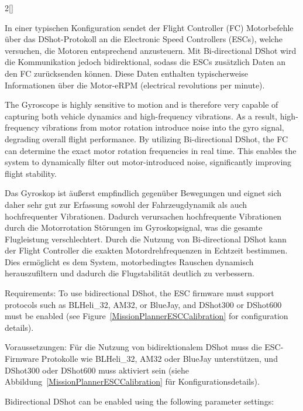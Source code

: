 \begin{paracol}{2}[]
\colger

In einer typischen Konfiguration sendet der Flight Controller (FC) Motorbefehle über das DShot-Protokoll an die Electronic Speed Controllers (ESCs), welche versuchen, die Motoren entsprechend anzusteuern. Mit Bi-directional DShot wird die Kommunikation jedoch bidirektional, sodass die ESCs zusätzlich Daten an den FC zurücksenden können. Diese Daten enthalten typischerweise Informationen über die Motor-eRPM (electrical revolutions per minute).

\coleng

The Gyroscope is highly sensitive to motion and is therefore very capable of capturing both vehicle dynamics and high-frequency vibrations. As a result, high-frequency vibrations from motor rotation introduce noise into the gyro signal, degrading overall flight performance. By utilizing Bi-directional DShot, the FC can determine the exact motor rotation frequencies in real time. This enables the system to dynamically filter out motor-introduced noise, significantly improving flight stability.

\colger

Das Gyroskop ist äußerst empfindlich gegenüber Bewegungen und eignet sich daher sehr gut zur Erfassung sowohl der Fahrzeugdynamik als auch hochfrequenter Vibrationen. Dadurch verursachen hochfrequente Vibrationen durch die Motorrotation Störungen im Gyroskopsignal, was die gesamte Flugleistung verschlechtert. Durch die Nutzung von Bi-directional DShot kann der Flight Controller die exakten Motordrehfrequenzen in Echtzeit bestimmen. Dies ermöglicht es dem System, motorbedingtes Rauschen dynamisch herauszufiltern und dadurch die Flugstabilität deutlich zu verbessern.

\coleng

Requirements: To use bidirectional DShot, the ESC firmware must support protocols such as BLHeli\_32, AM32, or BlueJay, and DShot300 or DShot600 must be enabled (see Figure~\ref{MissionPlannerESCCalibration} for configuration details).

\colger

Voraussetzungen: Für die Nutzung von bidirektionalem DShot muss die ESC-Firmware Protokolle wie BLHeli\_32, AM32 oder BlueJay unterstützen, und DShot300 oder DShot600 muss aktiviert sein (siehe Abbildung~\ref{MissionPlannerESCCalibration} für Konfigurationsdetails).

\coleng

Bidirectional DShot can be enabled using the following parameter settings:


\end{paracol}
